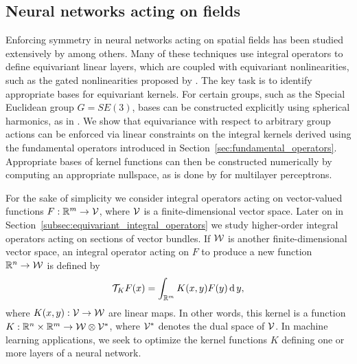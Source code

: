 \documentclass[twoside,11pt]{article}
\begin{document}
\subsection{Neural networks acting on fields}
\label{subsec:NNs_acting_on_fields}
Enforcing symmetry in neural networks acting on spatial fields has been studied extensively by \cite{weiler20183d, cohen2018spherical, esteves2018learning, Kondor2018generalization, Cohen2019general} among others.
Many of these techniques use integral operators to define equivariant linear layers, which are coupled with equivariant nonlinearities, such as the gated nonlinearities proposed by \cite{weiler20183d}.
The key task is to identify appropriate bases for equivariant kernels.
For certain groups, such as the Special Euclidean group $G = SE(3)$, bases can be constructed explicitly using spherical harmonics, as in \cite{weiler20183d}. 
We show that equivariance with respect to arbitrary group actions can be enforced via linear constraints on the integral kernels derived using the fundamental operators introduced in Section~\ref{sec:fundamental_operators}.
Appropriate bases of kernel functions can then be constructed numerically by computing an appropriate nullspace, as is done by \cite{Finzi2021practical} for multilayer perceptrons.

For the sake of simplicity we consider integral operators acting on vector-valued functions $F:\mathbb{R}^m\to {\mathcal{V}}$, where ${\mathcal{V}}$ is a finite-dimensional vector space.
Later on in Section~\ref{subsec:equivariant_integral_operators} we study higher-order integral operators acting on sections of vector bundles.
If ${\mathcal{W}}$ is another finite-dimensional vector space, an integral operator acting on $F$ to produce a new function $\mathbb{R}^n\to {\mathcal{W}}$ is defined by
\begin{equation}
    {\mathcal{T}}_K F(x) = \int_{\mathbb{R}^m} K(x,y) F(y) \operatorname{\mathrm{d}} y,
    \label{eqn:intergral_operator_on_Rn}
\end{equation}
where $K(x,y): {\mathcal{V}} \to {\mathcal{W}}$ are linear maps.
In other words, this kernel is a function $K : \mathbb{R}^n \times \mathbb{R}^m \to {\mathcal{W}} \otimes {\mathcal{V}}^*$, where ${\mathcal{V}}^*$ denotes the dual space of ${\mathcal{V}}$.
In machine learning applications, we seek to optimize the kernel functions $K$ defining one or more layers of a neural network.
\end{document}
